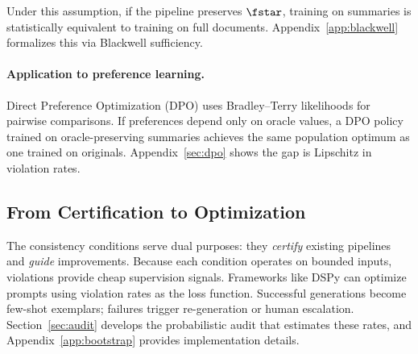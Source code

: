 Under this assumption, if the pipeline preserves $\fstar$, training on summaries is statistically equivalent to training on full documents. Appendix~\ref{app:blackwell} formalizes this via Blackwell sufficiency.

\paragraph{Application to preference learning.}
Direct Preference Optimization (DPO) \citep{RafailovEtAl2023DPO} uses Bradley--Terry likelihoods for pairwise comparisons. If preferences depend only on oracle values, a DPO policy trained on oracle-preserving summaries achieves the same population optimum as one trained on originals. Appendix~\ref{sec:dpo} shows the gap is Lipschitz in violation rates.

\subsection{From Certification to Optimization}\label{sec:optimization-preview}

The consistency conditions serve dual purposes: they \emph{certify} existing pipelines and \emph{guide} improvements. Because each condition operates on bounded inputs, violations provide cheap supervision signals. Frameworks like DSPy \citep{khattab2024dspy} can optimize prompts using violation rates as the loss function. Successful generations become few-shot exemplars; failures trigger re-generation or human escalation. Section~\ref{sec:audit} develops the probabilistic audit that estimates these rates, and Appendix~\ref{app:bootstrap} provides implementation details.
